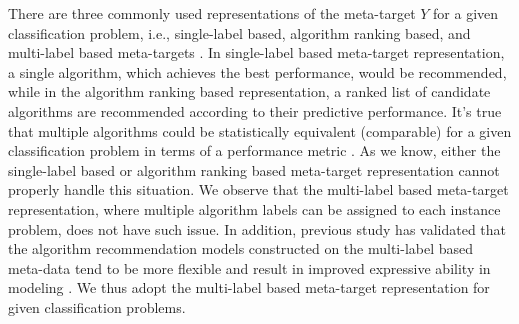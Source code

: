 \documentclass[prodmode,acmtkdd]{acmsmall}
\begin{document}
There are three commonly used representations of the meta-target $Y$ for a given classification problem,
i.e., single-label based, algorithm ranking based, and multi-label based meta-targets \cite{wang2014generic}.
In single-label based meta-target representation,
a single algorithm, which achieves the best performance, would be recommended,
while in the algorithm ranking based representation,
a ranked list of candidate algorithms are recommended according to their predictive performance.
It's true that multiple algorithms could be statistically equivalent (comparable) for a given classification problem in terms of a performance metric \cite{wang2014generic}.
As we know, either the single-label based or algorithm ranking based meta-target representation cannot properly handle this situation.
We observe that the multi-label based meta-target representation, where multiple algorithm labels can be assigned to each instance problem,
does not have such issue.
In addition,
previous study has validated that the algorithm recommendation models constructed on the multi-label based meta-data
tend to be more flexible and result in improved expressive ability in modeling \cite{wang2014generic}.
We thus adopt the multi-label based meta-target representation for given classification problems.

\end{document}
